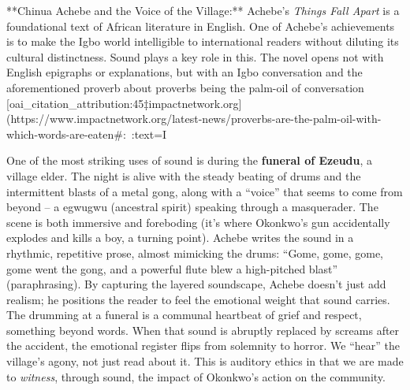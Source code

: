 \documentclass[12pt]{report}
\begin{document}
**Chinua Achebe and the Voice of the Village:** Achebe’s \textit{Things Fall Apart} is a foundational text of African literature in English. One of Achebe’s achievements is to make the Igbo world intelligible to international readers without diluting its cultural distinctness. Sound plays a key role in this. The novel opens not with English epigraphs or explanations, but with an Igbo conversation and the aforementioned proverb about proverbs being the palm-oil of conversation [oai_citation_attribution:45‡impactnetwork.org](https://www.impactnetwork.org/latest-news/proverbs-are-the-palm-oil-with-which-words-are-eaten#:~:text=I%

One of the most striking uses of sound is during the \textbf{funeral of Ezeudu}, a village elder. The night is alive with the steady beating of drums and the intermittent blasts of a metal gong, along with a “voice” that seems to come from beyond – a egwugwu (ancestral spirit) speaking through a masquerader. The scene is both immersive and foreboding (it’s where Okonkwo’s gun accidentally explodes and kills a boy, a turning point). Achebe writes the sound in a rhythmic, repetitive prose, almost mimicking the drums: “Gome, gome, gome, gome went the gong, and a powerful flute blew a high-pitched blast” (paraphrasing). By capturing the layered soundscape, Achebe doesn’t just add realism; he positions the reader to feel the emotional weight that sound carries. The drumming at a funeral is a communal heartbeat of grief and respect, something beyond words. When that sound is abruptly replaced by screams after the accident, the emotional register flips from solemnity to horror. We “hear” the village’s agony, not just read about it. This is auditory ethics in that we are made to \textit{witness}, through sound, the impact of Okonkwo’s action on the community.
\end{document}
